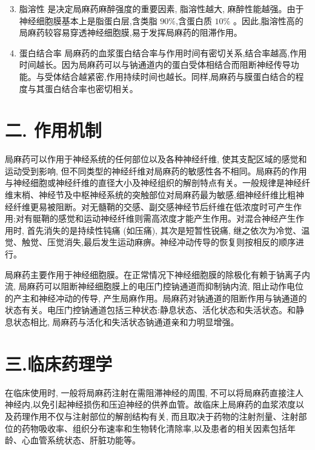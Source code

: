 \documentclass[10pt]{article}
\begin{document}
\begin{enumerate}
  \setcounter{enumi}{2}
  \item 脂溶性 是决定局麻药麻醉强度的重要因素, 脂溶性越大, 麻醉性能越强。由于神经细胞膜基本上是脂蛋白层,含类脂 $90 \%$,含蛋白质 $10 \%$ 。因此,脂溶性高的局麻药较容易穿透神经细胞膜,易于发挥局麻药的阻滞作用。

  \item 蛋白结合率 局麻药的血浆蛋白结合率与作用时间有密切关系,结合率越高,作用时间越长。因为局麻药可以与钠通道内的蛋白受体相结合而阻断神经传导功能。与受体结合越紧密,作用持续时间也越长。同样,局麻药与膜蛋白结合的程度与其蛋白结合率也密切相关。

\end{enumerate}

\section*{二. 作用机制}
局麻药可以作用于神经系统的任何部位以及各种神经纤维, 使其支配区域的感觉和运动受到影响, 但不同类型的神经纤维对局麻药的敏感性各不相同。局麻药的作用与神经细胞或神经纤维的直径大小及神经组织的解剖特点有关。一般规律是神经纤维末梢、神经节及中枢神经系统的突触部位对局麻药最为敏感,细神经纤维比粗神经纤维更易被阻断。对无髓鞘的交感、副交感神经节后纤维在低浓度时可产生作用;对有䯕鞘的感觉和运动神经纤维则需高浓度才能产生作用。对混合神经产生作用时, 首先消失的是持续性钝痛 (如压痛), 其次是短暂性锐痛, 继之依次为冷觉、温觉、触觉、压觉消失,最后发生运动麻痹。神经冲动传导的恢复则按相反的顺序进行。

局麻药主要作用于神经细胞膜。在正常情况下神经细胞膜的除极化有赖于钠离子内流, 局麻药可以阻断神经细胞膜上的电压门控钠通道而抑制钠内流, 阻止动作电位的产主和神经冲动的传导, 产生局麻作用。局麻药对钠通道的阻断作用与钠通道的状态有关。电压门控钠通道包括三种状态:静息状态、活化状态和失活状态。和静息状态相比, 局麻药与活化和失活状态钠通道亲和力明显增强。

\section*{三.临床药理学}
在临床使用时, 一般将局麻药注射在需阻滞神经的周围, 不可以将局麻药直接注人神经内,以免引起神经损伤和压迫神经的供养血管。故临床上局麻药的血浆浓度以及药理作用不仅与注射部位的解剖结构有关, 而且取决于药物的注射剂量、注射部位的药物吸收率、组织分布速率和生物转化清除率,以及患者的相关因素包括年龄、心血管系统状态、肝脏功能等。
\end{document}
